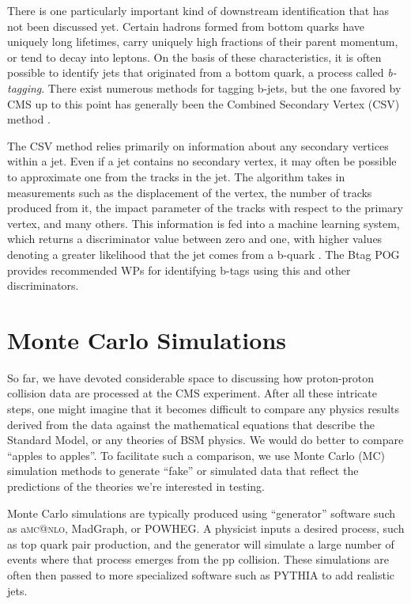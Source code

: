There is one particularly important kind of downstream identification
that has not been discussed yet. Certain hadrons formed
from bottom quarks have uniquely long lifetimes, carry uniquely high
fractions of their parent momentum, or tend to decay into leptons. On
the basis of these characteristics, it is often possible to identify
jets that originated from a bottom quark, a process called
\emph{b-tagging}. There exist numerous methods for tagging b-jets, but
the one favored by CMS up to this point has generally been the
Combined Secondary Vertex (CSV) method \cite{btag1,btag2}.

The CSV method relies primarily on information about any secondary vertices
within a jet. Even if a jet contains no secondary vertex, it may often
be possible to approximate one from the tracks in the jet. The
algorithm takes in measurements such as the displacement of the
vertex, the number of tracks produced from it, the impact parameter of
the tracks with respect to the primary vertex, and many others. This
information is fed into a machine learning system, which returns a
discriminator value between zero and one, with higher values denoting
a greater likelihood that the jet comes from a b-quark
\cite{btag1,btag2}. The Btag POG provides recommended WPs for
identifying b-tags using this and other discriminators.

\section{Monte Carlo Simulations}
\label{sec:cms:montecarlo}

So far, we have devoted considerable space to discussing how
proton-proton collision data are processed at the CMS
experiment. After all these intricate steps, one might imagine that it
becomes difficult to compare any physics results derived from the
data against the mathematical equations that describe the Standard
Model, or any theories of BSM physics. We would do better to compare
``apples to apples''. To facilitate such a comparison, we use Monte
Carlo (MC) simulation methods to generate ``fake'' or simulated data
that reflect the predictions of the theories we're interested in
testing.

Monte Carlo simulations are typically produced using ``generator''
software such as a\textsc{mc@nlo}, MadGraph, or POWHEG. A physicist
inputs a desired process, such as top quark pair production, and the %
generator will simulate a large number of events where that process
emerges from the pp collision. These simulations are often then passed
to more specialized software such as PYTHIA to add realistic jets.

